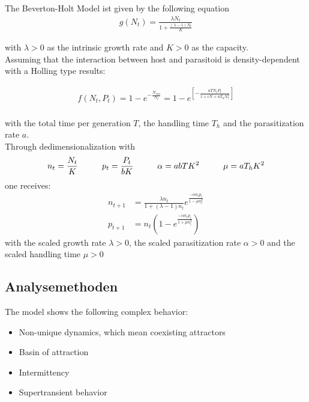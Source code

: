 \documentclass[a4paper,12pt, twoside]{article} %
\begin{document}
The Beverton-Holt Model ist given by the following equation
\begin{equation}
  \begin{split}
    g(N_t) = \frac{\lambda N_t}{1 + \frac{(\lambda -1)N_t}{K}}
  \end{split}
\end{equation}

with $\lambda > 0$ as the intrinsic growth rate and $K > 0$ as the capacity.\\

Assuming that the interaction between host and parasitoid is density-dependent with a Holling type
 results:

\begin{equation}
  \begin{split}
    f(N_t, P_t) = 1 - e^{- \frac{N_{enc}}{N_t}} =1- e^{\left[- \frac{aTN_t P_t}{1+cN+aT_h N_t^2} \right]} \\
  \end{split}
\end{equation}

with the total time per generation $T$, the handling time $T_h$ and the parasitization rate $a$.\\

Through dedimensionalization with
\begin{equation}
  n_t = \frac{N_t}{K} \hspace*{10mm} p_t=\frac{P_t}{bK} \hspace*{10mm} \alpha = abTK^2 \hspace*{10mm} \mu = aT_h K^2
\end{equation}
one receives:
\begin{equation}
  \begin{split}
    n_{t+1} &= \frac{\lambda n_t}{1+(\lambda -1) n_t} e^{\frac{-\alpha n_t p_t}{1-\mu n_t^2}}\\
    p_{t+1} &= n_t \left( 1-e^{\frac{-\alpha n_t p_t}{1+\mu n_t^2}}\right)
  \end{split}
\end{equation}
with the scaled growth rate $\lambda > 0$, the scaled parasitization rate $\alpha > 0$ and 
the scaled handling time $\mu > 0$

\subsection{Analysemethoden}
The model shows the following complex behavior:
\begin{itemize}
  \item Non-unique dynamics, which mean coexisting attractors
  \item Basin of attraction
  \item Intermittency
  \item Supertransient behavior
\end{itemize}
\end{document}
